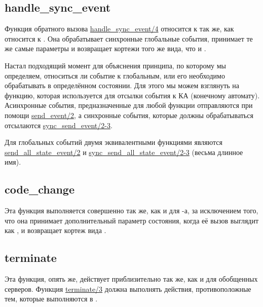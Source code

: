 \subsection{handle\_sync\_event}
\label{handle-sync-event}
Функция обратного вызова \href{http://erldocs.com/R15B/stdlib/gen\_fsm.html\#handle\_sync\_event/4}{handle\_sync\_event/4} относится к  так же, как  относится к .
Она обрабатывает синхронные глобальные события, принимает те же самые параметры и возвращает кортежи того же вида, что и .

Настал подходящий момент для объяснения принципа, по которому мы определяем, относиться ли событие к глобальным, или его необходимо обрабатывать в определённом состоянии.
Для этого мы можем взглянуть на функцию, которая используется для отсылки события к КА (конечному автомату).
Асинхронные события, предназначенные для любой функции  отправляются при помощи \href{http://erldocs.com/R15B/stdlib/gen\_fsm.html\#send\_event/2}{send\_event/2}, а синхронные события, которые должны обрабатываться  отсылаются \href{http://erldocs.com/R15B/stdlib/gen\_fsm.html\#sync\_send\_event/2}{sync\_send\_event/2-3}.

Для глобальных событий двумя эквивалентными функциями являются \href{http://erldocs.com/R15B/stdlib/gen\_fsm.html\#send\_all\_state\_event/2}{send\_all\_state\_event/2} и \href{http://erldocs.com/R15B/stdlib/gen\_fsm.html\#sync\_send\_all\_state\_event/2}{sync\_send\_all\_state\_event/2-3} (весьма длинное имя).

\subsection{code\_change}
\label{code-change}
Эта функция выполняется совершенно так же, как и для \--а, за исключением того, что она принимает дополнительный параметр состояния, когда её вызов выглядит как , и возвращает кортеж вида .

\subsection{terminate}
\label{terminate}
Эта функция, опять же, действует приблизительно так же, как и для обобщенных серверов.
Функция \href{http://erldocs.com/R15B/stdlib/gen\_fsm.html\#terminate/3}{terminate/3} должна выполнять действия, противоположные тем, которые выполняются в .

